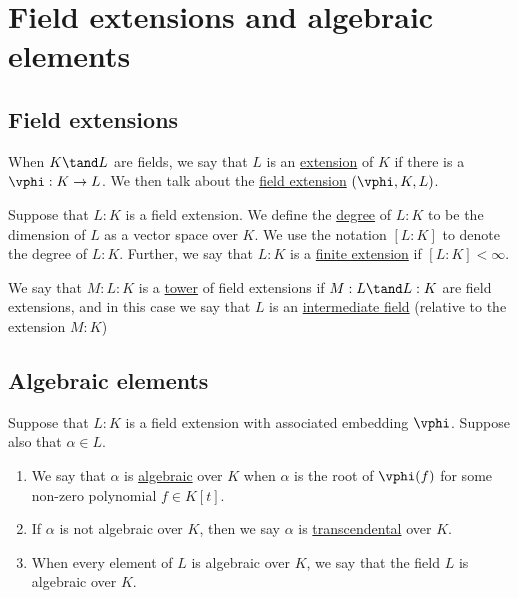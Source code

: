 \documentclass{article}
\begin{document}
\section{Field extensions and algebraic elements}
\subsection{Field extensions}
  \begin{tdefinition}
    When \( K \tand L \) are fields, we say that \( L \) is an \ul{extension} of \( K \) if
  there is a \homo~\( \vphi: K \to L \). We then talk about the \ul{field extension}
  \( (\vphi,K,L) \).
  \end{tdefinition}

  \begin{tdefinition}
    Suppose that \( L:K \) is a field extension.
    We define the \ul{degree} of \( L:K \) to be the dimension of \( L \) as a vector space over \( K \).
    We use the notation \( [L : K] \) to denote the degree of \( L : K \).
    Further, we say that \( L : K \) is a \ul{finite extension} if \( [L: K] <\infty \).
  \end{tdefinition}

  \begin{tdefinition}
    We say that \( M : L : K \) is a \ul{tower} of field extensions if \( M : L \tand L: K \) are field extensions, and in this case we say that \( L \) is an \ul{intermediate field} (relative to the extension \( M : K \))
  \end{tdefinition}

\subsection{Algebraic elements}
  \begin{tdefinition}
    Suppose that \( L: K \) is a field extension with associated embedding \( \vphi \).
    Suppose also that \( \alpha\in L \). \begin{enumerate}[label=(\roman*)]
      \item We say that \( \alpha \) is \ul{algebraic} over \( K \) when \( \alpha \) is the root of \( \vphi(f) \) for some non-zero polynomial \( f \in K[t] \).
      \item If \( \alpha \) is not algebraic over \( K \), then we say \( \alpha \) is \ul{transcendental} over \( K \).
      \item When every element of \( L \) is algebraic over \( K \), we say that the field \( L \) is algebraic over \( K \).
    \end{enumerate}
  \end{tdefinition}
\end{document}
